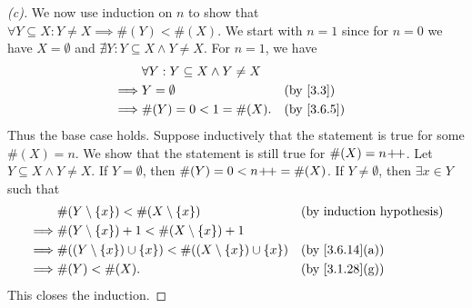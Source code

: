 \begin{proof}[(c)]
	We now use induction on \(n\) to show that \(\forall Y \subseteq X : Y \neq X \implies \#(Y) < \#(X)\).
	We start with \(n = 1\) since for \(n = 0\) we have \(X = \emptyset\) and \(\nexists Y : Y \subseteq X \land Y \neq X\).
	For \(n = 1\), we have
	\begin{align*}
		         & \forall Y : Y \subseteq X \land Y \neq X                 \\
		\implies & Y = \emptyset                            &  & \by{3.3}   \\
		\implies & \#(Y) = 0 < 1 = \#(X).                   &  & \by{3.6.5}
	\end{align*}
	Thus the base case holds.
	Suppose inductively that the statement is true for some \(\#(X) = n\).
	We show that the statement is still true for \(\#(X) = n\!+\!\!+\).
	Let \(Y \subseteq X \land Y \neq X\).
	If \(Y = \emptyset\), then \(\#(Y) = 0 < n\!+\!\!+ = \#(X)\).
	If \(Y \neq \emptyset\), then \(\exists x \in Y\) such that
	\begin{align*}
		         & \#(Y \setminus \set{x}) < \#(X \setminus \set{x})                               &  & \byIH                        \\
		\implies & \#(Y \setminus \set{x}) + 1 < \#(X \setminus \set{x}) + 1                                                         \\
		\implies & \#((Y \setminus \set{x}) \cup \set{x}) < \#((X \setminus \set{x}) \cup \set{x}) &  & \text{(by \cref{3.6.14}(a))} \\
		\implies & \#(Y) < \#(X).                                                                  &  & \text{(by \cref{3.1.28}(g))}
	\end{align*}
	This closes the induction.
\end{proof}

